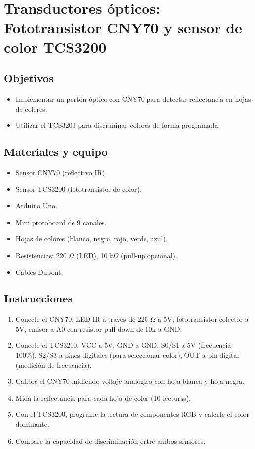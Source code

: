 \chapter{Transductores ópticos: Fototransistor CNY70 y sensor de color TCS3200}

\section*{Objetivos}
\begin{itemize}
    \item Implementar un portón óptico con CNY70 para detectar reflectancia en hojas de colores.
    \item Utilizar el TCS3200 para discriminar colores de forma programada.
\end{itemize}

\section*{Materiales y equipo}
\begin{itemize}
    \item Sensor CNY70 (reflectivo IR).
    \item Sensor TCS3200 (fototransistor de color).
    \item Arduino Uno.
    \item Mini protoboard de 9 canales.
    \item Hojas de colores (blanco, negro, rojo, verde, azul).
    \item Resistencias: 220 $\Omega$ (LED), 10 k$\Omega$ (pull-up opcional).
    \item Cables Dupont.
\end{itemize}

\section*{Instrucciones}
\begin{enumerate}
    \item Conecte el CNY70: LED IR a través de 220 $\Omega$ a 5V; fototransistor colector a 5V, emisor a A0 con resistor pull-down de 10k a GND.
    \item Conecte el TCS3200: VCC a 5V, GND a GND, S0/S1 a 5V (frecuencia 100\%), S2/S3 a pines digitales (para seleccionar color), OUT a pin digital (medición de frecuencia).
    \item Calibre el CNY70 midiendo voltaje analógico con hoja blanca y hoja negra.
    \item Mida la reflectancia para cada hoja de color (10 lecturas).
    \item Con el TCS3200, programe la lectura de componentes RGB y calcule el color dominante.
    \item Compare la capacidad de discriminación entre ambos sensores.
\end{enumerate}

